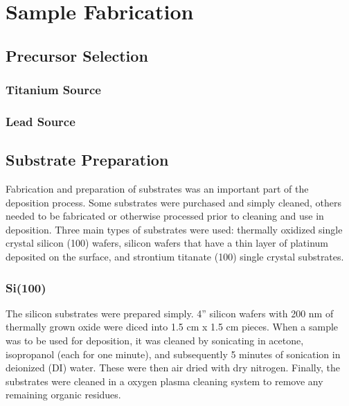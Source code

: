 \chapter{Sample Fabrication}
\label{ch:Fabrication}
\thispagestyle{empty}



\section{Precursor Selection}

\lipsum

\subsection{Titanium Source}

\lipsum

\subsection{Lead Source}

\lipsum


\section{Substrate Preparation}

Fabrication and preparation of substrates was an important part of the deposition process. Some substrates were purchased and simply cleaned, others needed to be fabricated or otherwise processed prior to cleaning and use in deposition. Three main types of substrates were used: thermally oxidized single crystal silicon (100) wafers, silicon wafers that have a thin layer of platinum deposited on the surface, and strontium titanate (100) single crystal substrates. 

\subsection{Si(100)} \label{sect:Si}

The silicon substrates were prepared simply. 4'' silicon wafers with 200 nm of thermally grown oxide were diced into 1.5 cm x 1.5 cm pieces. When a sample was to be used for deposition, it was cleaned by sonicating in acetone, isopropanol (each for one minute), and subsequently 5 minutes of sonication in deionized (DI) water. These were then air dried with dry nitrogen. Finally, the substrates were cleaned in a oxygen plasma cleaning system to remove any remaining organic residues. 


